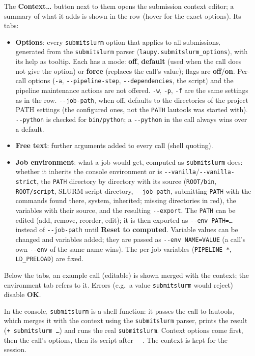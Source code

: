 \documentclass[11pt,a4paper]{article}
\newcommand{\cmd}[1]{\texttt{#1}}
\newcommand{\ui}[1]{\textsf{\textbf{#1}}}
\begin{document}
The \ui{Context\ldots} button next to them opens the submission context editor; a summary of
what it adds is shown in the row (hover for the exact options). Its tabs:
\begin{itemize}
  \item \ui{Options}: every \cmd{submitslurm} option that applies to all submissions, generated
    from the \cmd{submitslurm} parser (\cmd{laupy.submitslurm\_options}), with its help as tooltip.
    Each has a mode: \ui{off}, \ui{default} (used when the call does not give the option) or
    \ui{force} (replaces the call's value); flags are \ui{off}/\ui{on}. Per-call options
    (\cmd{-a}, \cmd{-{}-pipeline-step}, \cmd{-{}-dependencies}, the script) and the pipeline maintenance
    actions are not offered. \cmd{-w}, \cmd{-p}, \cmd{-f} are the same settings as in the row.
    \cmd{-{}-job-path}, when off, defaults to the directories of the project PATH settings (the
    configured ones, not the \cmd{PATH} lautools was started with). \cmd{-{}-python} is checked for
    \cmd{bin/python}; a \cmd{-{}-python} in the call always wins over a default.
  \item \ui{Free text}: further arguments added to every call (shell quoting).
  \item \ui{Job environment}: what a job would get, computed as \cmd{submitslurm} does: whether it
    inherits the console environment or is \cmd{-{}-vanilla}/\cmd{-{}-vanilla-strict}, the \cmd{PATH} directory by directory
    with its source (\cmd{ROOT/bin}, \cmd{ROOT/script}, SLURM script directory, \cmd{-{}-job-path}, submitting \cmd{PATH}
    with the commands found there, system, inherited; missing directories in red), the variables with their source, and the
    resulting \cmd{-{}-export}. The \cmd{PATH} can be edited (add, remove, reorder, edit); it is
    then exported as \cmd{-{}-env PATH=\ldots} instead of \cmd{-{}-job-path} until
    \ui{Reset to computed}. Variable values can be changed and variables added; they are passed as
    \cmd{-{}-env NAME=VALUE} (a call's own \cmd{-{}-env} of the same name wins). The per-job variables
    (\cmd{PIPELINE\_*}, \cmd{LD\_PRELOAD}) are fixed.
\end{itemize}
Below the tabs, an example call (editable) is shown merged with the context; the environment
tab refers to it. Errors (e.g.\ a value \cmd{submitslurm} would reject) disable \ui{OK}.

In the console, \cmd{submitslurm} is a shell function: it passes the call to lautools, which
merges it with the context using the \cmd{submitslurm} parser, prints the result
(\cmd{+ submitslurm \ldots}) and runs the real \cmd{submitslurm}. Context options come first, then
the call's options, then its script after \cmd{-{}-}. The context is kept for the session.
\end{document}
